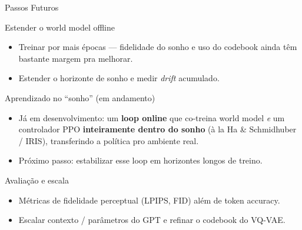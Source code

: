 \documentclass[11pt,aspectratio=169]{beamer}
\begin{document}
\begin{frame}{Passos Futuros}
  \small
  \begin{block}{Estender o world model offline}
    \begin{itemize}
      \item Treinar por mais épocas --- fidelidade do sonho e uso do codebook
            ainda têm bastante margem pra melhorar.
      \item Estender o horizonte de sonho e medir \emph{drift} acumulado.
    \end{itemize}
  \end{block}

  \begin{block}{Aprendizado no ``sonho'' (em andamento)}
    \begin{itemize}
      \item Já em desenvolvimento: um \textbf{loop online} que co-treina
            world model \emph{e} um controlador PPO \textbf{inteiramente
            dentro do sonho} (à la Ha \& Schmidhuber / IRIS), transferindo a
            política pro ambiente real.
      \item Próximo passo: estabilizar esse loop em horizontes longos de
            treino.
    \end{itemize}
  \end{block}

  \begin{block}{Avaliação e escala}
    \begin{itemize}
      \item Métricas de fidelidade perceptual (LPIPS, FID) além de token accuracy.
      \item Escalar contexto / parâmetros do GPT e refinar o codebook do VQ-VAE.
    \end{itemize}
  \end{block}
\end{frame}
\end{document}
